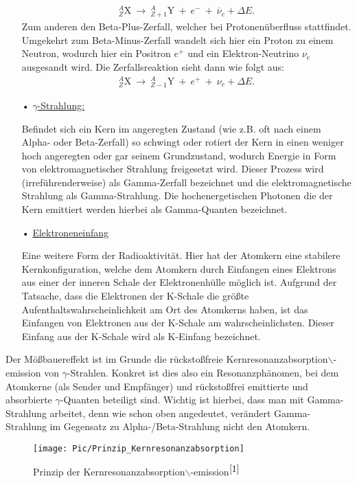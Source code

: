 \documentclass[10pt,twoside]{article}
\newcommand{\nach}{\longrightarrow}
\renewcommand{\bar}{\overline}
\renewcommand{\1}{^{-1}}
\renewcommand{\2}{^{-2}}
\newcommand{\3}{^{-3}}
\newcommand{\4}{^{-4}}
\newcommand{\5}{^{-5}}
\newcommand{\6}{^{-6}}
\newcommand{\7}{^{-7}}
\newcommand{\8}{^{-8}}
\newcommand{\9}{^{-9}}
\begin{document}
\begin{enumerate}[itemsep=0pt]
\begin{align*}
^{A}_{Z}\text{X} ~ \nach ~ ^{A}_{Z+1}\text{Y} ~+~ e^- ~+~\bar{\nu}_e + \Delta E{.}
\end{align*} 
Zum anderen den Beta-Plus-Zerfall, 
welcher bei Protonenüberfluss stattfindet. 
Umgekehrt zum Beta-Minus-Zerfall wandelt sich hier ein Proton zu einem Neutron,
wodurch hier ein Positron $e^+$ und ein Elektron-Neutrino $\nu_e$ ausgesandt wird. 
Die Zerfallsreaktion sieht dann wie folgt aus:
\begin{align*}
^{A}_{Z}\text{X} ~ \nach ~ ^{A}_{Z-1}\text{Y} ~+~ e^+ ~+~\nu_e + \Delta E{.}
\end{align*} 
\item[•] \underline{$\gamma$-Strahlung:} \par
Befindet sich ein Kern im angeregten Zustand 
(wie z.B. oft nach einem Alpha- oder Beta-Zerfall) 
so schwingt oder rotiert der Kern in einen weniger hoch angeregten oder gar seinem Grundzustand, 
wodurch Energie in Form von elektromagnetischer Strahlung freigesetzt wird. 
Dieser Prozess wird (irreführenderweise) als Gamma-Zerfall bezeichnet 
und die elektromagnetische Strahlung als Gamma-Strahlung. 
Die hochenergetischen Photonen die der Kern emittiert werden hierbei als Gamma-Quanten bezeichnet.
\item[•] \underline{Elektroneneinfang} \par
Eine weitere Form der Radioaktivität. Hier hat der Atomkern eine stabilere Kernkonfiguration, welche dem Atomkern durch Einfangen eines Elektrons aus einer der inneren Schale der Elektronenhülle möglich ist. Aufgrund der Tatsache, dass die Elektronen der K-Schale die größte Aufenthaltswahrscheinlichkeit am Ort des Atomkerns haben, ist das Einfangen von Elektronen aus der K-Schale am wahrscheinlichsten. Dieser Einfang aus der K-Schale wird als K-Einfang bezeichnet. 
\end{enumerate}
Der Mößbauereffekt ist im Grunde die rückstoßfreie Kernresonanzabsorption$\backslash$-emission von $\gamma$-Strahlen. 
Konkret ist dies also ein Resonanzphänomen, 
bei dem Atomkerne (als Sender und Empfänger) und rückstoßfrei emittierte und absorbierte $\gamma$-Quanten beteiligt sind.
Wichtig ist hierbei, dass man mit Gamma-Strahlung arbeitet, denn wie schon oben angedeutet, 
verändert Gamma-Strahlung im Gegensatz zu 
Alpha-/Beta-Strahlung nicht den Atomkern. \par
\begin{figure}[H]
\centering
\texttt{[image: Pic/Prinzip\_Kernresonanzabsorption]}
\caption{Prinzip der Kernresonanzabsorption$\backslash$-emission${^{\cite{1}}}$}
\label{Kern}
\end{figure}
\end{document}

